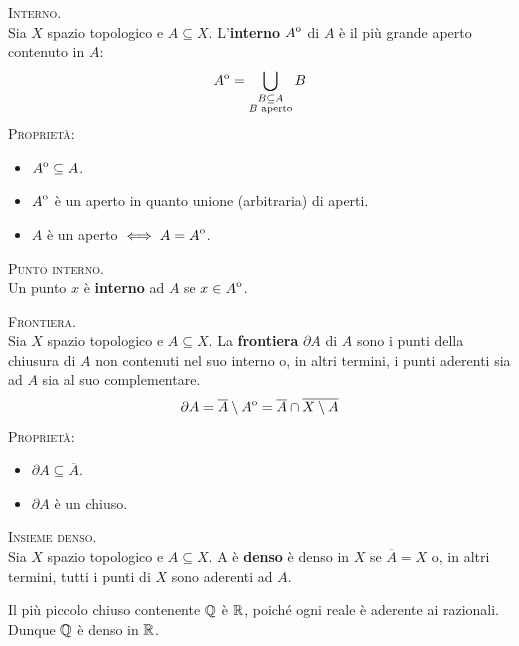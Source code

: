 \begin{define}\textsc{Interno.}\\
Sia $X$ spazio topologico e $A\subseteq X$. L'\textbf{interno} ${\kern0ptA}^{\mathrm{o}}$ di $A$ è il più grande aperto contenuto in $A$:
\begin{equation}
	{\kern0ptA}^{\mathrm{o}}=\mathop{{\bigcup}}\displaylimits_{\substack{B\subseteq A\\ B\text{ aperto}}}B
\end{equation}
\textsc{Proprietà:}
\begin{itemize}
	\item ${\kern0ptA}^{\mathrm{o}}\subseteq A$.
	\item ${\kern0ptA}^{\mathrm{o}}$ è un aperto in quanto unione (arbitraria) di aperti.
	\item $A$ è un aperto $\iff A={\kern0ptA}^{\mathrm{o}}$.
\end{itemize}
\vspace{-3mm}
\end{define}
\begin{define}\textsc{Punto interno.}\\
	Un punto $x$ è \textbf{interno} ad $A$ se $x\in{\kern0ptA}^{\mathrm{o}}$.
\end{define}
\begin{define}\textsc{Frontiera.}\\
Sia $X$ spazio topologico e $A\subseteq X$. La \textbf{frontiera} $\partial A$ di $A$ sono i punti della chiusura di $A$ non contenuti nel suo interno o, in altri termini, i punti aderenti sia ad $A$ sia al suo complementare.
\begin{equation}
\partial A=\overline{A}\setminus {\kern0ptA}^{\mathrm{o}}=\overline{A}\cap\overline{X\setminus A}
\end{equation}
\textsc{Proprietà:}
\begin{itemize}
	\item $\partial{A}\subseteq \overline{A}$.
	\item $\partial{A}$ è un chiuso.
\end{itemize}
\vspace{-3mm}
\end{define}
\begin{define}\textsc{Insieme denso.}\\
Sia $X$ spazio topologico e $A\subseteq X$. A è \textbf{denso} è denso in $X$ se $\overline{A}=X$ o, in altri termini, tutti i punti di $X$ sono aderenti ad $A$.
\end{define}
\begin{example}
Il più piccolo chiuso contenente $\mathbb{Q}$ è $\mathbb{R}$, poiché ogni reale è aderente ai razionali. Dunque $\mathbb{Q}$ è denso in $\mathbb{R}$.
\end{example}
